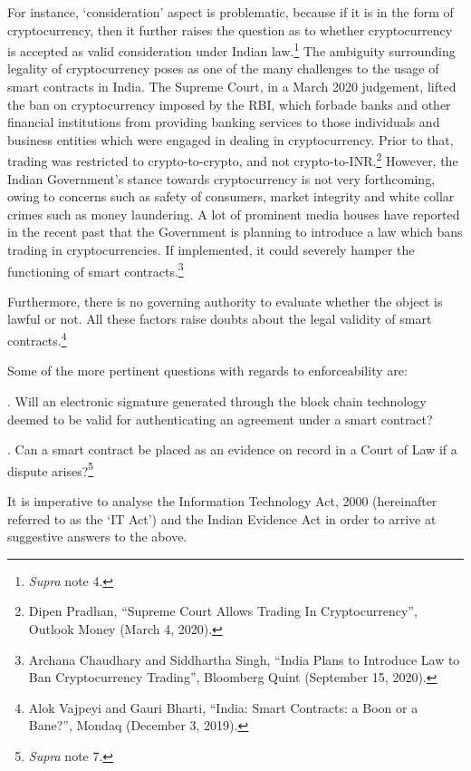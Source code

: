 \begin{multicols}{2}
\vspace{-.1cm}

\noi
For instance, ‘consideration’ aspect is problematic, because if it is in the form of
cryptocurrency, then it further raises the question as to whether cryptocurrency is accepted as valid consideration under Indian law.\footnote{\textit{Supra} note 4.} The ambiguity surrounding legality of cryptocurrency
poses as one of the many challenges to the usage of smart contracts in India. The Supreme
Court, in a March 2020 judgement, lifted the ban on cryptocurrency imposed by the RBI,
which forbade banks and other financial institutions from providing banking services to those
individuals and business entities which were engaged in dealing in cryptocurrency. Prior to
that, trading was restricted to crypto-to-crypto, and not crypto-to-INR.\footnote{Dipen Pradhan, “Supreme Court Allows Trading In Cryptocurrency”, Outlook Money (March 4, 2020).} However, the Indian
Government’s stance towards cryptocurrency is not very forthcoming, owing to concerns
such as safety of consumers, market integrity and white collar crimes such as money
laundering. A lot of prominent media houses have reported in the recent past that the
Government is planning to introduce a law which bans trading in cryptocurrencies. If
implemented, it could severely hamper the functioning of smart contracts.\footnote{Archana Chaudhary and Siddhartha Singh, “India Plans to Introduce Law to Ban Cryptocurrency Trading”,
Bloomberg Quint (September 15, 2020).}

\noi
Furthermore, there is no governing authority to evaluate whether the object is lawful or not.
All these factors raise doubts about the legal validity of smart contracts.\footnote{Alok Vajpeyi and Gauri Bharti, “India: Smart Contracts: a Boon or a Bane?”, Mondaq (December 3, 2019).}

\noi
Some of the more pertinent questions with regards to enforceability are: 

. Will an electronic signature generated through the block chain technology deemed to be
valid for authenticating an agreement under a smart contract? 

. Can a smart contract be placed as an evidence on record in a Court of Law if a dispute
arises?\footnote{\textit{Supra} note 7.}

\noi
It is imperative to analyse the Information Technology Act, 2000 (hereinafter referred to as
the ‘IT Act’) and the Indian Evidence Act in order to arrive at suggestive answers to the
above.


\end{multicols}
